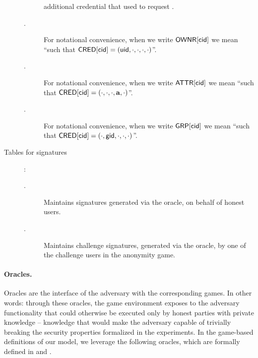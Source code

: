 \begin{description}
\begin{description}
    additional credential that \uid used to request \cred.
  \item[\OWNR.] For notational convenience, when we write $\mathsf{OWNR}[\mathsf{cid}]$ we mean
    ``\uid such that $\mathsf{CRED}[\mathsf{cid}] = (\mathsf{uid}, \cdot, \cdot, \cdot, \cdot)$''.
  \item[\ATTR.] For notational convenience, when we write $\mathsf{ATTR}[\mathsf{cid}]$ we mean
    ``\attrs such that $\mathsf{CRED}[\mathsf{cid}] = (\cdot, \cdot, \cdot, \mathbf{a}, \cdot)$''.
  \item[\GRP.] For notational convenience, when we write $\mathsf{GRP}[\mathsf{cid}]$ we mean
    ``\gid such that $\mathsf{CRED}[\mathsf{cid}] = (\cdot, \mathsf{gid}, \cdot, \cdot, \cdot)$''.
  \end{description}
\item[Tables for signatures]:
  \begin{description}
  \item[\SIG.] Maintains signatures generated via the \SIGN oracle, on behalf
    of honest users.
  \item[\CSIG.] Maintains challenge signatures, generated via the \CHALb oracle,
    by one of the challenge users in the anonymity game.
  \end{description}
\end{description}

\paragraph{Oracles.} %
Oracles are the interface of the adversary with the corresponding games. In
other words: through these oracles, the game environment exposes to the adversary
functionality that could otherwise be executed only by honest parties with
private knowledge -- knowledge that would make the adversary capable of
trivially breaking the security properties formalized in the experiments.
In the game-based definitions of our \UAS model, we leverage the following
oracles, which are formally defined in  and
. 

